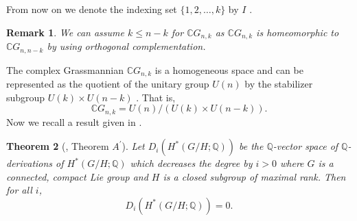 \documentclass{amsart}
\newtheorem{theorem}{Theorem}[section]
\newtheorem{remark}[theorem]{Remark}
\newcommand{\rank}{\mathrm{Rank}}
\begin{document}
	From %
now on we %
denote the indexing set $\{1,2,\dots, k\}$ by $I$%
.
	\begin{remark}
		We can assume  $k\leq n-k$ for  $\mathbb{C}G_{n,k}$ as $\mathbb{C}G_{n,k}$ is homeomorphic to $\mathbb{C}G_{n,n-k}$ by using orthogonal complementation.
	\end{remark}
	The %
complex Grassmannian $\mathbb{C}G_{n,k}$ is a homogeneous space and can be represented as the quotient of the unitary group $U(n)$ by the stabilizer subgroup %
$U(k)\times U(n-k)$ . That is, 
	\begin{equation}\label{cgn as hom}
		\mathbb{C}G_{n,k} = U(n)/ (U(k)\times U(n-k)). 
	\end{equation} Now %
we recall a result given %
in \cite{shiga-tezuka}.    
	\begin{theorem}[\cite{shiga-tezuka}, Theorem \(A^{'}\)]\label{Tezuka}
		Let %
$D_i(H^*(G/H;\mathbb{Q}))$ be the $\mathbb{Q}$-vector space of $\mathbb{Q}$-derivations of $H^*(G/H;\mathbb{Q})$ which decreases the degree %
by $i>0$ where %
$G$ is %
a connected, compact Lie group and $H$ is a closed subgroup of maximal rank.
		Then for %
all $i$, $$D_i(H^*(G/H;\mathbb{Q})) =0.$$  
	\end{theorem}
\end{document}
